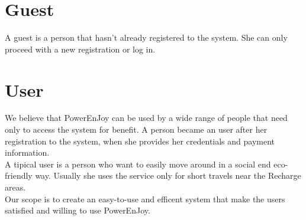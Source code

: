 \section{Guest}
A guest is a person that hasn't already registered to the system. She can only proceed with a new registration or log in.
\section{User}
We believe that PowerEnJoy can be used by a wide range of people that need only to access the system for benefit. A person became an user after her registration to the system, when she provides her credentials and payment information. 
\\A tipical user is a person who want to easily move around in a social end eco-friendly way. Usually she uses the service only for short travels near the \Glspl{Recharge area}.
\\Our scope is to create an easy-to-use and efficent system that make the users satisfied and willing to use PowerEnJoy.

